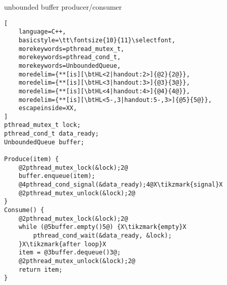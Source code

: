 \usetikzlibrary{arrows.meta,fit,matrix}

\begin{frame}[fragile,label=unboundedPC]{unbounded buffer producer/consumer}
\begin{lstlisting}[
    language=C++,
    basicstyle=\tt\fontsize{10}{11}\selectfont,
    morekeywords=pthread_mutex_t,
    morekeywords=pthread_cond_t,
    morekeywords=UnboundedQueue,
    moredelim={**[is][\btHL<2|handout:2>]{@2}{2@}},
    moredelim={**[is][\btHL<3|handout:3>]{@3}{3@}},
    moredelim={**[is][\btHL<4|handout:4>]{@4}{4@}},
    moredelim={**[is][\btHL<5-,3|handout:5-,3>]{@5}{5@}},
    escapeinside=XX,
]
pthread_mutex_t lock;
pthread_cond_t data_ready;
UnboundedQueue buffer;

Produce(item) {
    @2pthread_mutex_lock(&lock);2@
    buffer.enqueue(item);
    @4pthread_cond_signal(&data_ready);4@X\tikzmark{signal}X
    @2pthread_mutex_unlock(&lock);2@
}
Consume() {
    @2pthread_mutex_lock(&lock);2@
    while (@5buffer.empty()5@) {X\tikzmark{empty}X
        pthread_cond_wait(&data_ready, &lock);
    }X\tikzmark{after loop}X
    item = @3buffer.dequeue()3@;
    @2pthread_mutex_unlock(&lock);2@
    return item;
}
\end{lstlisting}
\end{frame}
